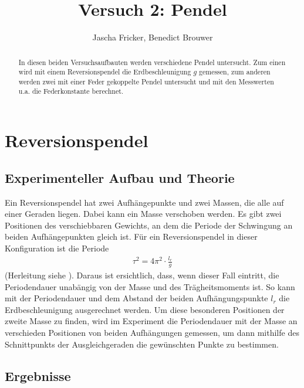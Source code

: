 \documentclass[11pt, a4paper]{article}
\title{Versuch 2: Pendel}
\author{Jascha Fricker, Benedict Brouwer}
\begin{document}
    \maketitle

    

    \begin{abstract}
        In diesen beiden Versuchsaufbauten werden verschiedene Pendel untersucht. Zum einen wird mit
        einem Reversionspendel die Erdbeschleunigung $g$ gemessen, zum anderen werden zwei mit einer Feder
        gekoppelte Pendel untersucht und mit den Messwerten u.a. die Federkonstante berechnet.
    \end{abstract}

    \tableofcontents

    \section{Reversionspendel}

    \subsection{Experimenteller Aufbau und Theorie}

    Ein Reversionspendel hat zwei Aufhängepunkte und zwei Massen, die alle auf einer Geraden liegen.
    Dabei kann ein Masse verschoben werden.
    Es gibt zwei Positionen des verschiebbaren Gewichts, an dem die Periode der Schwingung an beiden
    Aufhängepunkten gleich ist. Für ein Reversionspendel in dieser Konfiguration ist die Periode
    \begin{align}
        \tau^2 = 4\pi^2 \cdot \frac{l_r}{g}
    \end{align}
    (Herleitung siehe \cite[Abschitt 1.3]{pen}). Daraus ist ersichtlich, dass, wenn dieser Fall eintritt, die Periodendauer unabängig von der Masse und des
    Trägheitsmoments ist. So kann mit der Periodendauer und dem Abstand der beiden Aufhängungspunkte $l_r$
    die Erdbeschleunigung ausgerechnet werden.
    Um diese besonderen Positionen der zweite Masse zu finden, wird im Experiment die Periodendauer
    mit der Masse an verschieden Positionen von beiden Aufhängungen gemessen,
    um dann mithilfe des Schnittpunkts der Ausgleichgeraden die gewünschten
    Punkte  zu bestimmen.



    \subsection{Ergebnisse}
\end{document}
